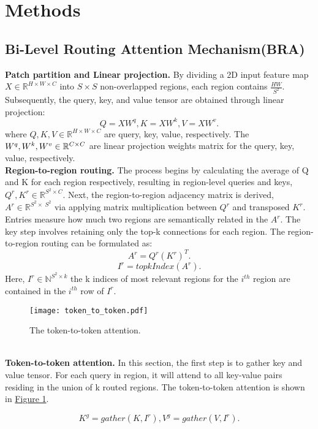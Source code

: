 \documentclass[preprint,12pt]{elsarticle}
\begin{document}
\section{Methods}
\subsection{Bi-Level Routing Attention Mechanism(BRA)}
\textbf{Patch partition and Linear projection.} By dividing a 2D input feature map $X \in \mathbb{R}^{H \times W \times C}$ into $S \times S$ non-overlapped regions, each region contains $\frac{{HW}}{{S^2}}$. Subsequently, the query, key, and value tensor are obtained through linear projection:
\[Q = X{W^q}, K = X{W^k}, V = X{W^v}.\]
where $Q, K, V \in {{\mathbb R}^{H \times W \times C}}$ are query, key, value, respectively. The ${W^q}, {W^k}\\, {W^v} \in{{\mathbb R}^{C \times C}}$
are linear projection weights matrix for the query, key, value, respectively.
\\
\textbf{Region-to-region routing.} The process begins by calculating the average of Q and K for each region respectively, resulting in region-level queries and keys, ${Q^r},{K^r} \in {{\mathbb R}^{{S^2} \times C}}$. Next, the region-to-region adjacency matrix is derived, ${A^r} \in {{\mathbb R}^{{S^2} \times \;{S^2}}}$ via applying matrix multiplication between ${Q^r}$ and transposed ${K^r}$. Entries measure how much two regions are semantically related in the ${A^r}$. The key step involves retaining only the top-k connections for each region. The region-to-region routing can be formulated as:
\[{A^r} = {Q^r}{({K^r})^T}.\]
\[{I^r} = topkIndex({A^r}).\]
Here, ${I^r} \in {{\mathbb N}^{{S^2} \times k}}$ the k indices of most relevant regions for the ${i^{th}}$ region are contained in the ${i^{th}}$
row of ${I^r}$.
\begin{figure}
\centering
\texttt{[image: token\_to\_token.pdf]}\\
\caption{The token-to-token attention.}
\hypertarget{first_image}{}
\end{figure}
\\
\textbf{Token-to-token attention.} In this section, the first step is to gather key and value tensor. For each query in region, it will attend to all key-value pairs residing in the union of k routed regions. The token-to-token attention is shown in \hyperlink{first_image}{Figure 1}.

\[{K^g} = gather(K,{I^r}), {V^g} = gather(V,{I^r}).\]
\end{document}
